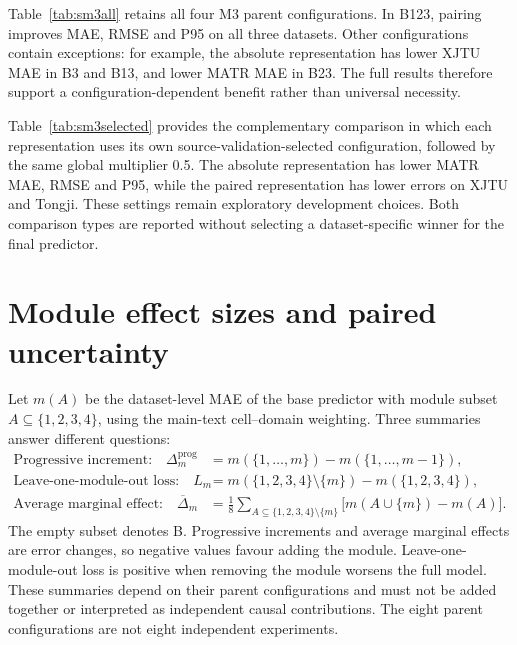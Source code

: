 \documentclass[11pt,a4paper]{article}
\begin{document}


Table~\ref{tab:sm3all} retains all four M3 parent configurations. In B123, pairing improves MAE, RMSE and P95 on all three datasets. Other configurations contain exceptions: for example, the absolute representation has lower XJTU MAE in B3 and B13, and lower MATR MAE in B23. The full results therefore support a configuration-dependent benefit rather than universal necessity.

Table~\ref{tab:sm3selected} provides the complementary comparison in which each representation uses its own source-validation-selected configuration, followed by the same global multiplier 0.5. The absolute representation has lower MATR MAE, RMSE and P95, while the paired representation has lower errors on XJTU and Tongji. These settings remain exploratory development choices. Both comparison types are reported without selecting a dataset-specific winner for the final predictor.



\section{Module effect sizes and paired uncertainty}
\label{sec:seffects}
Let $m(A)$ be the dataset-level MAE of the base predictor with module subset $A\subseteq\{1,2,3,4\}$, using the main-text cell--domain weighting. Three summaries answer different questions:
\begin{align}
\text{Progressive increment:}\quad
\Delta_m^{\mathrm{prog}}&=m(\{1,\ldots,m\})-m(\{1,\ldots,m-1\}),\\
\text{Leave-one-module-out loss:}\quad
L_m&=m(\{1,2,3,4\}\setminus\{m\})-m(\{1,2,3,4\}),\\
\text{Average marginal effect:}\quad
\overline\Delta_m&=\frac{1}{8}\sum_{A\subseteq\{1,2,3,4\}\setminus\{m\}}
\big[m(A\cup\{m\})-m(A)\big].
\end{align}
The empty subset denotes B. Progressive increments and average marginal effects are error changes, so negative values favour adding the module. Leave-one-module-out loss is positive when removing the module worsens the full model. These summaries depend on their parent configurations and must not be added together or interpreted as independent causal contributions. The eight parent configurations are not eight independent experiments.


\end{document}
